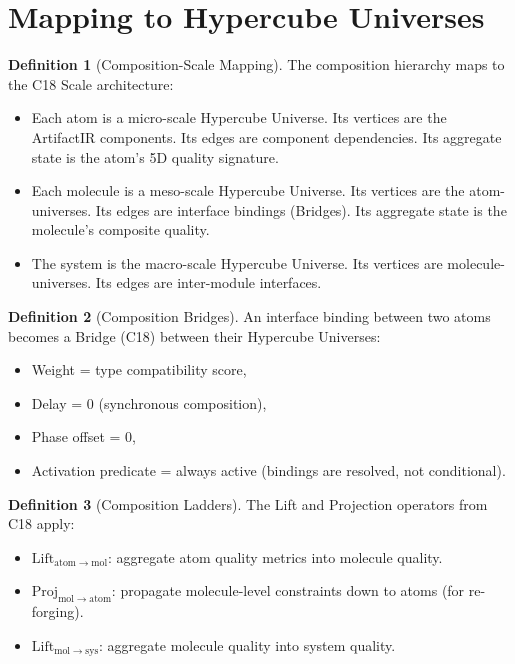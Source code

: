\documentclass[11pt,a4paper,twoside]{article}
\theoremstyle{definition}
\newtheorem{definition}{Definition}[section]
\theoremstyle{plain}
\theoremstyle{remark}
\begin{document}
\section{Mapping to Hypercube Universes}\label{sec:scalemap}

\begin{definition}[Composition-Scale Mapping]\label{def:scalemap}
The composition hierarchy maps to the C18 Scale architecture:
\begin{itemize}[nosep]
  \item Each atom is a micro-scale Hypercube Universe. Its vertices are
        the ArtifactIR components. Its edges are component dependencies.
        Its aggregate state is the atom's 5D quality signature.
  \item Each molecule is a meso-scale Hypercube Universe. Its vertices
        are the atom-universes. Its edges are interface bindings
        (Bridges). Its aggregate state is the molecule's composite
        quality.
  \item The system is the macro-scale Hypercube Universe. Its vertices
        are molecule-universes. Its edges are inter-module interfaces.
\end{itemize}
\end{definition}

\begin{definition}[Composition Bridges]\label{def:compbridges}
An interface binding between two atoms becomes a Bridge (C18) between
their Hypercube Universes:
\begin{itemize}[nosep]
  \item Weight = type compatibility score,
  \item Delay = 0 (synchronous composition),
  \item Phase offset = 0,
  \item Activation predicate = always active (bindings are resolved,
        not conditional).
\end{itemize}
\end{definition}

\begin{definition}[Composition Ladders]\label{def:compladders}
The Lift and Projection operators from C18 apply:
\begin{itemize}[nosep]
  \item $\mathrm{Lift}_{\mathrm{atom} \to \mathrm{mol}}$: aggregate
        atom quality metrics into molecule quality.
  \item $\mathrm{Proj}_{\mathrm{mol} \to \mathrm{atom}}$: propagate
        molecule-level constraints down to atoms (for re-forging).
  \item $\mathrm{Lift}_{\mathrm{mol} \to \mathrm{sys}}$: aggregate
        molecule quality into system quality.
\end{itemize}
\end{definition}
\end{document}
